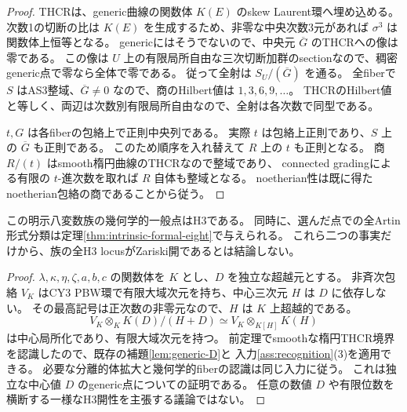\begin{proof}
THCRは、generic曲線の関数体 $K(E)$ のskew Laurent環へ埋め込める。
次数1の切断の比は $K(E)$ を生成するため、非零な中央次数3元があれば $\sigma^3$ は関数体上恒等となる。
genericにはそうでないので、中央元 $\overline G$ のTHCRへの像は零である。
この像は $U$ 上の有限局所自由な三次切断加群のsectionなので、稠密generic点で零なら全体で零である。
従って全射は $S_U/(\overline G)$ を通る。
全fiberで $S$ はAS3整域、$\overline G\ne0$ なので、商のHilbert値は $1,3,6,9,\ldots$。
THCRのHilbert値と等しく、両辺は次数別有限局所自由なので、全射は各次数で同型である。

$t,G$ は各fiberの包絡上で正則中央列である。
実際 $t$ は包絡上正則であり、$S$ 上の $\overline G$ も正則である。
このため順序を入れ替えて $R$ 上の $t$ も正則となる。
商 $R/(t)$ はsmooth楕円曲線のTHCRなので整域であり、
connected gradingによる有限の $t$-進次数を取れば $R$ 自体も整域となる。
noetherian性は既に得たnoetherian包絡の商であることから従う。
\end{proof}

\begin{corollary}[幾何学的一般点のH3性]\label{cor:eight-generic-H3}
この明示八変数族の幾何学的一般点はH3である。
同時に、選んだ点での全Artin形式分類は定理\ref{thm:intrinsic-formal-eight}で与えられる。
これら二つの事実だけから、族の全H3 locusがZariski開であるとは結論しない。
\end{corollary}
\begin{proof}
$\lambda,\kappa,\eta,\zeta,a,b,c$ の関数体を $K$ とし、$D$ を独立な超越元とする。
非斉次包絡 $V_K$ はCY3 PBW環で有限大域次元を持ち、中心三次元 $H$ は $D$ に依存しない。
その最高記号は正次数の非零元なので、$H$ は $K$ 上超越的である。
\[
 V_K\otimes_KK(D)/(H+D)
 \simeq V_K\otimes_{K[H]}K(H)
\]
は中心局所化であり、有限大域次元を持つ。
前定理でsmoothな楕円THCR境界を認識したので、既存の補題\ref{lem:generic-D}と
入力\ref{ass:recognition}(3)を適用できる。
必要な分離的体拡大と幾何学的fiberの認識は同じ入力に従う。
これは独立な中心値 $D$ のgeneric点についての証明である。
任意の数値 $D$ や有限位数を横断する一様なH3開性を主張する議論ではない。
\end{proof}
